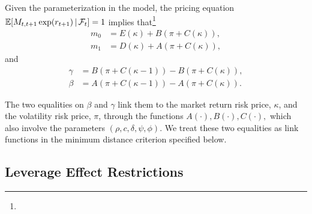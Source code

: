 \begin{lemma}
    \label{Lemma m0 and m1}
    Given the parameterization in the model, the pricing equation \newline $\operatorname{\mathbb{E}}[M_{t,t+1}\exp (r_{t+1}) \,\vert\, \mathcal{F}_{t}]=1$ implies that\footnote{}
%
    \begin{align*}
        m_{0} &= E(\kappa )+B\left( \pi +C\left( \kappa \right) \right) , \\
%
        m_{1} &= D\left( \kappa \right) +A\left( \pi +C\left( \kappa \right) \right) ,
    \end{align*}
    and
%
    \begin{align*}
        \gamma  &= B\left( \pi +C\left( \kappa -1\right) \right) -B\left( \pi +C\left( \kappa \right) \right), \\
        \beta  &= A\left( \pi +C\left( \kappa -1\right) \right) -A\left( \pi +C\left( \kappa \right) \right).
    \end{align*}
\end{lemma}

The two equalities on $\beta $ and $\gamma $ link them to the market return risk price, $\kappa$, and the volatility risk price, $\pi$,  through the functions $A(\cdot),B(\cdot ),C(\cdot ),$ which also involve the parameters $(\rho, c,\delta, \psi, \phi).$ We treat these two equalities as link functions in the minimum distance criterion specified below.

\subsection{Leverage Effect Restrictions}\label{sec:leverage effect restrict}


